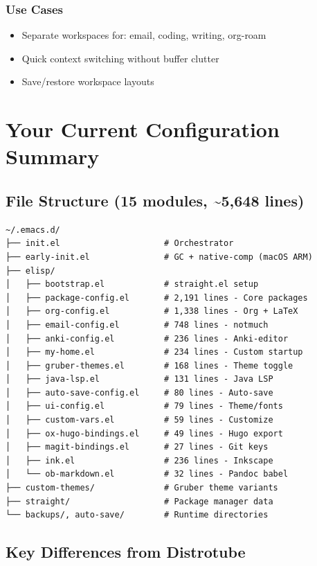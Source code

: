 \documentclass[11pt]{article}
\begin{document}
\subsubsection{Use Cases}
\label{sec:orgde4a99a}
\begin{itemize}
\item Separate workspaces for: email, coding, writing, org-roam
\item Quick context switching without buffer clutter
\item Save/restore workspace layouts
\end{itemize}
\section{Your Current Configuration Summary}
\label{sec:org2584a10}

\subsection{File Structure (15 modules, \textasciitilde{}5,648 lines)}
\label{sec:org17af647}

\begin{verbatim}
~/.emacs.d/
├── init.el                     # Orchestrator
├── early-init.el               # GC + native-comp (macOS ARM)
├── elisp/
│   ├── bootstrap.el            # straight.el setup
│   ├── package-config.el       # 2,191 lines - Core packages
│   ├── org-config.el           # 1,338 lines - Org + LaTeX
│   ├── email-config.el         # 748 lines - notmuch
│   ├── anki-config.el          # 236 lines - Anki-editor
│   ├── my-home.el              # 234 lines - Custom startup
│   ├── gruber-themes.el        # 168 lines - Theme toggle
│   ├── java-lsp.el             # 131 lines - Java LSP
│   ├── auto-save-config.el     # 80 lines - Auto-save
│   ├── ui-config.el            # 79 lines - Theme/fonts
│   ├── custom-vars.el          # 59 lines - Customize
│   ├── ox-hugo-bindings.el     # 49 lines - Hugo export
│   ├── magit-bindings.el       # 27 lines - Git keys
│   ├── ink.el                  # 236 lines - Inkscape
│   └── ob-markdown.el          # 32 lines - Pandoc babel
├── custom-themes/              # Gruber theme variants
├── straight/                   # Package manager data
└── backups/, auto-save/        # Runtime directories
\end{verbatim}
\subsection{Key Differences from Distrotube}
\label{sec:orgdf9f73d}
\end{document}
